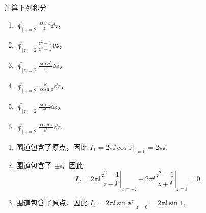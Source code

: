 \begin{question}
计算下列积分
\begin{enumerate}
  \item \(\displaystyle \oint_{|z|=2} \frac{\cos z}{z} \dd{z}\)，\qquad
  \item \(\displaystyle \oint_{|z|=2} \frac{z^2-1}{z^2+1} \dd{z}\)，\qquad
  \item \(\displaystyle \oint_{|z|=2} \frac{\sin \ee^{z}}{z} \dd{z}\)，\qquad
  \item \(\displaystyle \oint_{|z|=2} \frac{\ee^{z}}{\cosh z} \dd{z}\)，\qquad
  \item \(\displaystyle \oint_{|z|=2} \frac{\sin z}{z^2} \dd{z}\)，\qquad
  \item \(\displaystyle \oint_{|z|=2} \frac{\cosh z}{\ee^{z}} \dd{z}\).
\end{enumerate}

\begin{solution}
\begin{enumerate}
  \item 围道包含了原点，因此 \(I_1 = 2\pi\ii \left.\cos z\right|_{z=0}=2\pi\ii\).

  \item 围道包含了 \(\pm\ii\)，因此
\[ I_2 = 2\pi\ii \left.\frac{z^2-1}{z-\ii}\right|_{z=-\ii} + 2\pi\ii \left.\frac{z^2-1}{z+\ii}\right|_{z=\ii} = 0. \]

  \item 围道包含了原点，因此 \(I_3=2\pi\ii \left.\sin\ee^{z}\right|_{z=0}=2\pi\ii\sin 1\).


\end{enumerate}
\end{solution}
\end{question}
